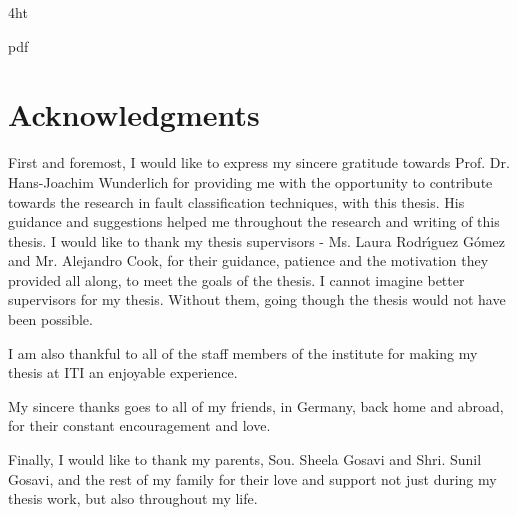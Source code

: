 \documentclass[
               paper=a4,
               BCOR1.92mm,DIV12,headinclude, %
               titlepage,
               bibliography=totoc,
               headsepline,
               cleardoublepage=empty,
               parskip=half,
	       pointlessnumbers, %
               final   %
               ]{scrreprt}
\begin{document}
\iftex4ht
\Configure{$}{\PicMath}{\EndPicMath}{} 

         {pdf}  
         {%
         }  
\fi

%
%





\VerbatimFootnotes %


\pagestyle{preamble}
\renewcommand*{\chapterpagestyle}{preamble}

\chapter*{Acknowledgments}
\begin{spacing}{1.5} 
First and foremost, I would like to express my sincere gratitude towards Prof. Dr. Hans-Joachim Wunderlich for providing me with the opportunity to contribute towards the research in fault classification techniques, with this thesis. His guidance and suggestions helped me throughout the research and writing of this thesis. I would like to thank my thesis supervisors - Ms. Laura Rodr\'{\i}guez G\'{o}mez and Mr. Alejandro Cook, for their guidance, patience and the motivation they provided all along, to meet the goals of the thesis. I cannot imagine better supervisors for my thesis. Without them, going though the thesis would not have been possible.

I am also thankful to all of the staff members of the institute for making my thesis at ITI an enjoyable experience.

My sincere thanks goes to all of my friends, in Germany, back home and abroad, for their constant encouragement and love.

Finally, I would like to thank my parents, Sou. Sheela Gosavi and Shri. Sunil Gosavi, and the rest of my family for their love and support not just during my thesis work, but also throughout my life.

\end{spacing}
\end{document}
